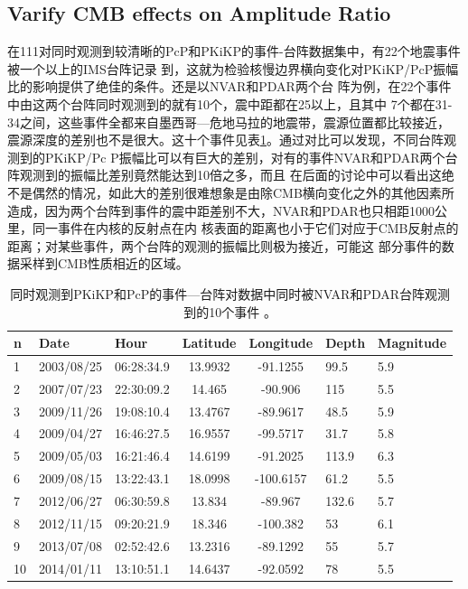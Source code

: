 \subsection{Varify CMB effects on Amplitude Ratio}

在111对同时观测到较清晰的PcP和PKiKP的事件-台阵数据集中，有22个地震事件被一个以上的IMS台阵记录
到，这就为检验核慢边界横向变化对PKiKP/PcP振幅比的影响提供了绝佳的条件。还是以NVAR和PDAR两个台
阵为例，在22个事件中由这两个台阵同时观测到的就有10个，震中距都在25{\textdegree}以上，且其中
7个都在31-34{\textdegree}之间，这些事件全都来自墨西哥—危地马拉的地震带，震源位置都比较接近，
震源深度的差别也不是很大。这十个事件见表\ref{nvpd}。通过对比可以发现，不同台阵观测到的PKiKP/Pc
P振幅比可以有巨大的差别，对有的事件NVAR和PDAR两个台阵观测到的振幅比差别竟然能达到10倍之多，而且
在后面的讨论中可以看出这绝不是偶然的情况，如此大的差别很难想象是由除CMB横向变化之外的其他因素所
造成，因为两个台阵到事件的震中距差别不大，NVAR和PDAR也只相距1000公里，同一事件在内核的反射点在内
核表面的距离也小于它们对应于CMB反射点的距离；对某些事件，两个台阵的观测的振幅比则极为接近，可能这
部分事件的数据采样到CMB性质相近的区域。

\begin{table}[!ht]
	\centering
	\begin{tabular}{*{3}{l}*{2}{c}*{2}{l}}
	\hline
	n & Date & Hour & Latitude & Longitude & Depth & Magnitude\\
	\hline
1 & 2003/08/25 & 06:28:34.9 &  13.9932 &  -91.1255 &  99.5 & 5.9\\
2 & 2007/07/23 & 22:30:09.2 &  14.465  &  -90.906  &  115  & 5.5\\
3 & 2009/11/26 & 19:08:10.4 &  13.4767 &  -89.9617 &  48.5 & 5.9\\
4 & 2009/04/27 & 16:46:27.5 &  16.9557 &  -99.5717 &  31.7 & 5.8\\
5 & 2009/05/03 & 16:21:46.4 &  14.6199 &  -91.2025 &  113.9 & 6.3\\
6 & 2009/08/15 & 13:22:43.1 &  18.0998 & -100.6157 &  61.2 & 5.5\\
7 & 2012/06/27 & 06:30:59.8 &  13.834  &  -89.967  &  132.6 & 5.7\\
8 & 2012/11/15 & 09:20:21.9 &  18.346  & -100.382  &  53  & 6.1\\
9 & 2013/07/08 & 02:52:42.6 &  13.2316 &  -89.1292 &  55  & 5.7\\
10 & 2014/01/11 & 13:10:51.1 &  14.6437 &  -92.0592 &  78  & 5.5\\
	\hline
\end{tabular}
	\caption{同时观测到PKiKP和PcP的事件—台阵对数据中同时被NVAR和PDAR台阵观测到的10个事件%
。}
	\label{nvpd}
\end{table}